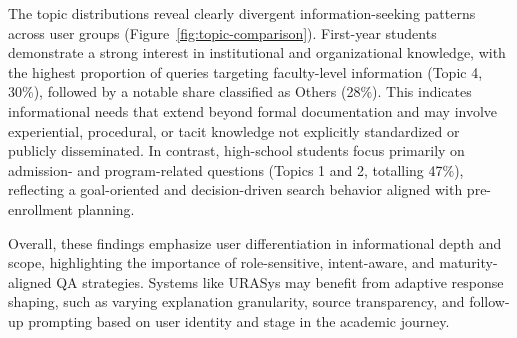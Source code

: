\documentclass[11pt]{article}
\begin{document}
The topic distributions reveal clearly divergent information-seeking patterns across user groups (Figure~\ref{fig:topic-comparison}). First-year students demonstrate a strong interest in institutional and organizational knowledge, with the highest proportion of queries targeting faculty-level information (Topic 4, 30\%), followed by a notable share classified as Others (28\%). This indicates informational needs that extend beyond formal documentation and may involve experiential, procedural, or tacit knowledge not explicitly standardized or publicly disseminated. In contrast, high-school students focus primarily on admission- and program-related questions (Topics 1 and 2, totalling 47\%), reflecting a goal-oriented and decision-driven search behavior aligned with pre-enrollment planning.

Overall, these findings emphasize user differentiation in informational depth and scope, highlighting the importance of role-sensitive, intent-aware, and maturity-aligned QA strategies. Systems like URASys may benefit from adaptive response shaping, such as varying explanation granularity, source transparency, and follow-up prompting based on user identity and stage in the academic journey.








\end{document}
